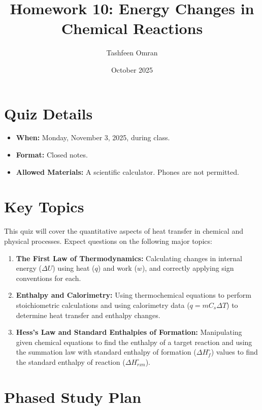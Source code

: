 \documentclass{article}
\title{Homework 10: Energy Changes in Chemical Reactions}
\author{Tashfeen Omran}
\date{October 2025}
\begin{document}
\maketitle

\section{Quiz Details}
\begin{itemize}
    \item \textbf{When:} Monday, November 3, 2025, during class.
    \item \textbf{Format:} Closed notes.
    \item \textbf{Allowed Materials:} A scientific calculator. Phones are not permitted.
\end{itemize}

\section{Key Topics}
This quiz will cover the quantitative aspects of heat transfer in chemical and physical processes. Expect questions on the following major topics:
\begin{enumerate}
    \item \textbf{The First Law of Thermodynamics:} Calculating changes in internal energy ($\Delta U$) using heat ($q$) and work ($w$), and correctly applying sign conventions for each.
    \item \textbf{Enthalpy and Calorimetry:} Using thermochemical equations to perform stoichiometric calculations and using calorimetry data ($q=mC_s\Delta T$) to determine heat transfer and enthalpy changes.
    \item \textbf{Hess's Law and Standard Enthalpies of Formation:} Manipulating given chemical equations to find the enthalpy of a target reaction and using the summation law with standard enthalpy of formation ($\Delta H_f^\circ$) values to find the standard enthalpy of reaction ($\Delta H_{rxn}^\circ$).
\end{enumerate}

\section{Phased Study Plan}
\end{document}
